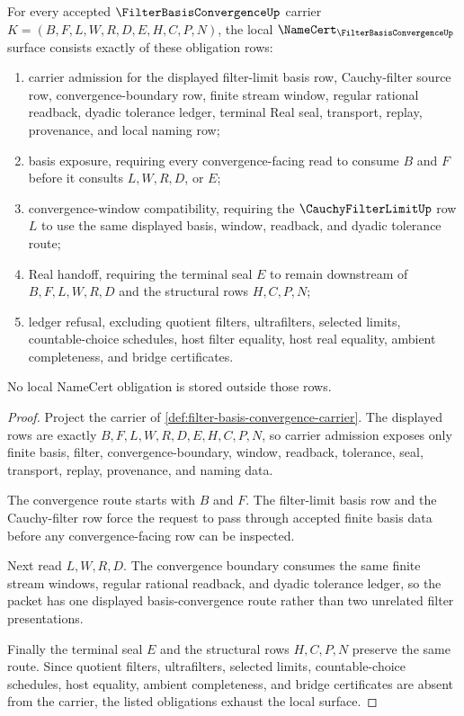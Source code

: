 \begin{theorem}
\label{thm:filter-basis-convergence-namecert-obligations}
For every accepted $\FilterBasisConvergenceUp$ carrier $K=(B,F,L,W,R,D,E,H,C,P,N)$, the local $\NameCert_{\FilterBasisConvergenceUp}$ surface consists exactly of these obligation rows:
\begin{enumerate}
\item carrier admission for the displayed filter-limit basis row, Cauchy-filter source row, convergence-boundary row, finite stream window, regular rational readback, dyadic tolerance ledger, terminal Real seal, transport, replay, provenance, and local naming row;
\item basis exposure, requiring every convergence-facing read to consume $B$ and $F$ before it consults $L,W,R,D$, or $E$;
\item convergence-window compatibility, requiring the $\CauchyFilterLimitUp$ row $L$ to use the same displayed basis, window, readback, and dyadic tolerance route;
\item Real handoff, requiring the terminal seal $E$ to remain downstream of $B,F,L,W,R,D$ and the structural rows $H,C,P,N$;
\item ledger refusal, excluding quotient filters, ultrafilters, selected limits, countable-choice schedules, host filter equality, host real equality, ambient completeness, and bridge certificates.
\end{enumerate}
No local NameCert obligation is stored outside those rows.
\end{theorem}
\begin{proof}
Project the carrier of \autoref{def:filter-basis-convergence-carrier}. The displayed rows are exactly $B,F,L,W,R,D,E,H,C,P,N$, so carrier admission exposes only finite basis, filter, convergence-boundary, window, readback, tolerance, seal, transport, replay, provenance, and naming data.

The convergence route starts with $B$ and $F$. The filter-limit basis row and the Cauchy-filter row force the request to pass through accepted finite basis data before any convergence-facing row can be inspected.

Next read $L,W,R,D$. The convergence boundary consumes the same finite stream windows, regular rational readback, and dyadic tolerance ledger, so the packet has one displayed basis-convergence route rather than two unrelated filter presentations.

Finally the terminal seal $E$ and the structural rows $H,C,P,N$ preserve the same route. Since quotient filters, ultrafilters, selected limits, countable-choice schedules, host equality, ambient completeness, and bridge certificates are absent from the carrier, the listed obligations exhaust the local surface.
\end{proof}


